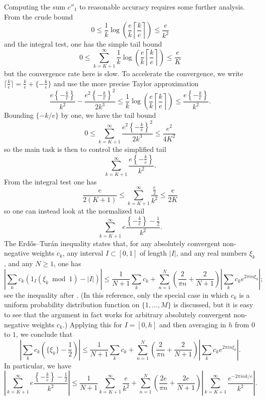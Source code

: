 \documentclass[10pt,a4paper,reqno]{amsart}
\numberwithin{equation}{section}
\theoremstyle{plain}
\theoremstyle{definition}
\renewcommand{\mod}{\bmod}
\begin{document}
Computing the sum $c''_1$ to reasonable accuracy requires some further analysis.  From the crude bound
$$0 \leq \frac{1}{k} \log\left(\frac{e}{k} \left\lceil \frac{k}{e} \right\rceil\right) \leq \frac{e}{k^2}$$
and the integral test, one has the simple tail bound
$$ 0 \leq \sum_{k=K+1}^\infty \frac{1}{k} \log\left(\frac{e}{k} \left\lceil \frac{k}{e} \right\rceil\right) \leq \frac{e}{K}$$
but the convergence rate here is slow.  To accelerate the convergence, we write $\lceil\frac{k}{e} \rceil = \frac{k}{e} + \{-\frac{k}{e}\}$ and use the more precise Taylor approximation
$$ \frac{e \left\{-\frac{k}{e}\right\}}{k^2} - \frac{e^2 \left\{-\frac{k}{e}\right\}^2}{2k^3}
\leq \frac{1}{k} \log\left(\frac{e}{k} \left\lceil \frac{k}{e} \right\rceil\right) \leq \frac{e \left\{-\frac{k}{e}\right\}}{k^2}.$$
Bounding $\{-k/e\}$ by one, we have the tail bound
$$ 0 \leq \sum_{k=K+1}^\infty \frac{e^2 \left\{-\frac{k}{e}\right\}^2}{2k^3} \leq \frac{e^2}{4K^2}$$
so the main task is then to control the simplified tail
$$ \sum_{k=K+1}^\infty \frac{e\left\{-\frac{k}{e}\right\}}{k^2}.$$
From the integral test one has
$$ \frac{e}{2(K+1)} \leq \sum_{k=K+1}^\infty \frac{\frac{e}{2}}{k^2} \leq \frac{e}{2K}$$
so one can instead look at the normalized tail
$$ \sum_{k=K+1}^\infty e\frac{\left\{-\frac{k}{e}\right\}-\frac{1}{2}}{k^2}.$$
The Erd\H{o}s--Tur\'an inequality states that, for any absolutely convergent non-negative weights $c_k$, any interval $I \subset [0,1]$ of length $|I|$, and any real numbers $\xi_k$, and any $N \geq 1$, one has
$$ \left|\sum_k c_k (1_I(\xi_k \mod 1) - |I|)\right| \leq \frac{1}{N+1} \sum_k c_k + \sum_{n=1}^N \left(\frac{2}{\pi n} + \frac{2}{N+1}\right) \left|\sum_k c_k e^{2\pi i n \xi_k}\right|;$$
see the inequality after \cite[Theorem 20]{vaaler}.  (In this reference, only the special case in which $c_k$ is a uniform probability distribution function on $\{1,\dots,M\}$ is discussed, but it is easy to see that the argument in fact works for arbitrary absolutely convergent non-negative weights $c_k$.)  Applying this for $I = [0,h]$ and then averaging in $h$ from $0$ to $1$, we conclude that
$$ \left|\sum_k c_k \left(\{\xi_k\}-\frac{1}{2}\right)\right| \leq \frac{1}{N+1} \sum_k c_k + \sum_{n=1}^N \left(\frac{2}{\pi n} + \frac{2}{N+1}\right) \left|\sum_k c_k e^{2\pi i n \xi_k}\right|.$$
In particular, we have
$$ \left| \sum_{k=K+1}^\infty e\frac{\left\{-\frac{k}{e}\right\}-\frac{1}{2}}{k^2}\right| \leq \frac{1}{N+1} \sum_{k=K+1}^\infty \frac{e}{k^2}
+ \sum_{n=1}^N \left(\frac{2e}{\pi n} + \frac{2e}{N+1}\right) \left|\sum_{k=K+1}^\infty \frac{e^{-2\pi i n k/e}}{k^2}\right|.
$$
\end{document}
